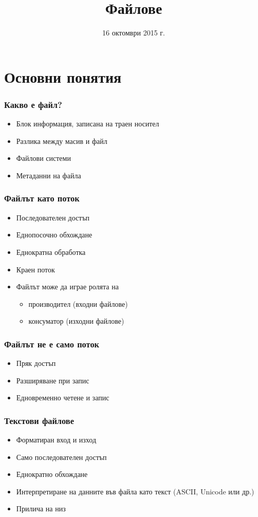 \documentclass{beamer}
\title{Файлове}
\date{16 октомври 2015 г.}
\begin{document}
\begin{frame}
  \titlepage
\end{frame}

\section{Основни понятия}

\begin{frame}
  \frametitle{Какво е файл?}

  \begin{itemize}
  \item Блок информация, записана на траен носител
  \item Разлика между масив и файл
  \item Файлови системи
  \item Метаданни на файла
  \end{itemize}
\end{frame}

\begin{frame}
  \frametitle{Файлът като поток}
  
  \begin{itemize}
  \item Последователен достъп
  \item Еднопосочно обхождане
  \item Еднократна обработка
  \item Краен поток
  \item Файлът може да играе ролята на
    \begin{itemize}
    \item производител (входни файлове)
    \item консуматор (изходни файлове)
    \end{itemize}
  \end{itemize}
\end{frame}

\begin{frame}
  \frametitle{Файлът не е само поток}

  \begin{itemize}
  \item Пряк достъп
  \item Разширяване при запис
  \item Едновременно четене и запис
  \end{itemize}
\end{frame}

\begin{frame}
  \frametitle{Текстови файлове}
  \begin{itemize}
  \item Форматиран вход и изход
  \item Само последователен достъп
  \item Еднократно обхождане
  \item Интерпретиране на данните във файла като текст (ASCII, Unicode или др.)
  \item Прилича на низ
  \end{itemize}
\end{frame}
\end{document}
